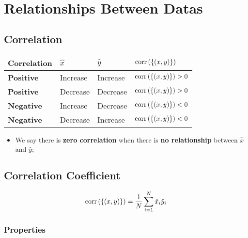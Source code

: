 \chapter{Relationships Between Datas}

\section{Correlation}

  \begin{tabu} to \linewidth{ X[l] | X[l] X[l] X[l] }
    \hline
    \textbf{Correlation} & $ \hat{x} $ & $ \hat{y} $ & $ \operatorname{corr}\left( \{ \left( x, y \right) \} \right) $ \\ \hline
    \textbf{Positive} & Increase & Increase & $ \operatorname{corr}\left( \{ \left( x, y \right) \} \right) > 0 $ \\
    \textbf{Positive} & Decrease & Decrease & $ \operatorname{corr}\left( \{ \left( x, y \right) \} \right) > 0 $ \\
    \textbf{Negative} & Increase & Decrease & $ \operatorname{corr}\left( \{ \left( x, y \right) \} \right) < 0 $ \\
    \textbf{Negative} & Decrease & Increase & $ \operatorname{corr}\left( \{ \left( x, y \right) \} \right) < 0 $ \\ \hline
  \end{tabu}
  
  \begin{itemize}
    \item We say there is \textbf{zero correlation} when there is \textbf{no relationship} between $ \hat{x} $ and $ \hat{y} $;
  \end{itemize}
  
\section{Correlation Coefficient}

  \begin{equation}
    \operatorname{corr}\left( \{ \left( x, y \right) \} \right) = \frac{1}{N} \sum_{i = 1}^{N} \hat{x}_{i} \hat{y}_{i}
  \end{equation}
  
  \subsection{Properties}
  
